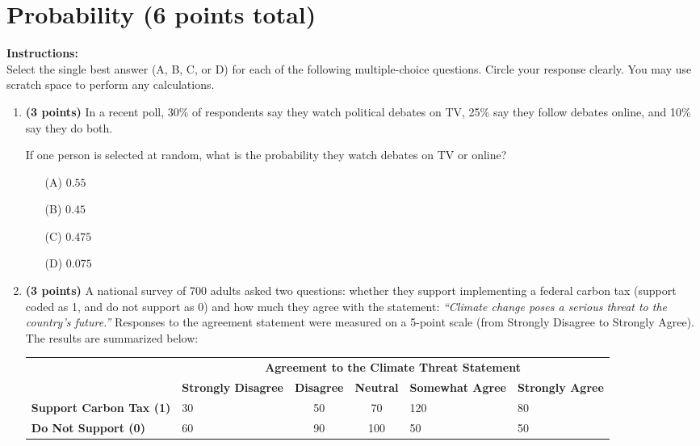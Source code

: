 \documentclass{article}
\newcommand{\blankbox}[2][3cm]{%
    \vspace{-0.5em}
    \begin{figure}[H]
        \makebox[\linewidth]{%
            \begin{tcolorbox}[
                colback=white, 
                colframe=white,  %
                width=#2, %
                height=#1,
                boxrule=0.2mm
            ]
            \end{tcolorbox}
        }
    \end{figure}
    \vspace{-2em}
}
\begin{document}
\section{Probability (6 points total)} 
\noindent\textbf{Instructions:} \\
Select the single best answer (A, B, C, or D) for each of the following multiple-choice questions. Circle your response clearly. You may use scratch space to perform any calculations.
\begin{enumerate}

\item \textbf{(3 points)} In a recent poll, 30\% of respondents say they watch political debates on TV, 25\% say they follow debates online, and 10\% say they do both. 

If one person is selected at random, what is the probability they watch debates on TV or online?
\begin{enumerate} 
    \item[(A)] $0.55$ 
    \item[(B)] $0.45$ 
    \item[(C)] $0.475$ 
    \item[(D)] $0.075$ 
\end{enumerate}  \blankbox[1.5cm]{1.0\linewidth}

\item \textbf{(3 points)}  A national survey of 700 adults asked two questions: whether they support implementing a federal carbon tax (support coded as 1, and do not support as 0) and how much they agree with the statement:  
\textit{“Climate change poses a serious threat to the country’s future.”}  
Responses to the agreement statement were measured on a 5-point scale (from Strongly Disagree to Strongly Agree). The results are summarized below:

\begin{center}
\begin{tabular}{lp{1.6cm}ccp{1.6cm}p{1.6cm}} \hline
 & \multicolumn{5}{c}{\textbf{Agreement to the Climate Threat Statement}} \\ \cline{2-6}
 & \textbf{Strongly Disagree} & \textbf{Disagree} & \textbf{Neutral} & \textbf{Somewhat Agree} & \textbf{Strongly Agree} \\ \hline
\textbf{Support Carbon Tax (1)}       &  30 &  50 &  70 & 120 &  80 \\
\textbf{Do Not Support (0)} &  60 &  90 & 100 &  50 &  50 \\ \hline
\end{tabular}
\end{center}


\end{enumerate}
\end{document}
